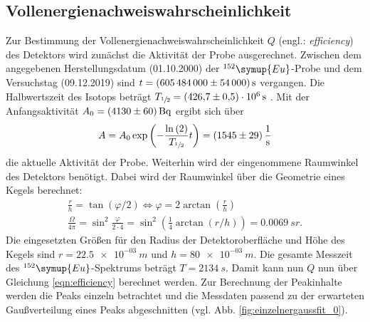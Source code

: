 \FloatBarrier
\subsection{Vollenergienachweiswahrscheinlichkeit}
\label{kap:vw}
Zur Bestimmung der Vollenergienachweiswahrscheinlichkeit $Q$ (engl.: \textit{efficiency}) des Detektors wird zunächst die Aktivität der Probe ausgerechnet.
Zwischen dem angegebenen Herstellungsdatum (01.10.2000) \cite{anleitung} der $^{152}\symup{Eu}$-Probe und dem Versuchstag (09.12.2019) sind $t = \SI{605484000 (54000)}{s}$ vergangen.
Die Halbwertszeit des Isotops beträgt $T_{\sfrac{1}{2}} = \SI{426.7 (5) e+06}{s}$ \cite{nucleide}.
Mit der Anfangsaktivität $A_{0} = \SI{4130 (60)}{Bq}$ ergibt sich über
\begin{equation}
	A = A_{0} \exp{\left( - \frac{\ln{(2)}}{T_{\sfrac{1}{2}}} t \right)} = \SI{1545(29)}{\per \second}
	\label{result:aktivität}
\end{equation}
die aktuelle Aktivität der Probe.
Weiterhin wird der eingenommene Raumwinkel des Detektors benötigt.
Dabei wird der Raumwinkel über die Geometrie eines Kegels berechnet:
\begin{align*}
	\frac{r}{h} = \tan{( \varphi / 2 )} \Leftrightarrow \varphi = 2 \arctan{(\frac{r}{h})} \\
	\frac{\Omega}{4 \pi} = \sin^2{\frac{\varphi}{2 \cdot 4}} =  \sin^2{ \left( \frac{1}{4} \arctan{(r/h)} \right)} = \SI{0.0069}{sr}.
	\label{result:raumwinkel}
\end{align*}
Die eingesetzten Größen für den Radius der Detektoroberfläche und Höhe des Kegels sind $r = \SI{22.5e-03}{m}$ und $h = \SI{80e-03}{m}$.
Die gesamte Messzeit des $^{152}\symup{Eu}$-Spektrums beträgt $T=\SI{2134}{s}$.
Damit kann nun $Q$ nun über Gleichung \eqref{eqn:efficiency} berechnet werden.
Zur Berechnung der Peakinhalte werden die Peaks einzeln betrachtet und die Messdaten passend zu der erwarteten Gaußverteilung eines Peaks abgeschnitten (vgl. Abb. \ref{fig:einzelnergaussfit_0}).
